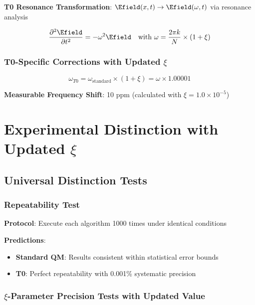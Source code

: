 	\textbf{T0 Resonance Transformation}: $\Efield(x,t) \rightarrow \Efield(\omega,t)$ via resonance analysis
	
	\begin{equation}
		\frac{\partial^2 \Efield}{\partial t^2} = -\omega^2 \Efield \quad \text{with } \omega = \frac{2\pi k}{N} \times (1 + \xi)
	\end{equation}
	
	\subsubsection{T0-Specific Corrections with Updated $\xi$}
	
	\begin{equation}
		\omega_{T0} = \omega_{\text{standard}} \times (1 + \xi) = \omega \times 1.00001
	\end{equation}
	
	\textbf{Measurable Frequency Shift}: 10 ppm (calculated with $\xi = 1.0 \times 10^{-5}$)
	
	\section{Experimental Distinction with Updated $\xi$}
	
	\subsection{Universal Distinction Tests}
	
	\subsubsection{Repeatability Test}
	
	\textbf{Protocol}: Execute each algorithm 1000 times under identical conditions
	
	\textbf{Predictions}:
	\begin{itemize}
		\item \textbf{Standard QM}: Results consistent within statistical error bounds
		\item \textbf{T0}: Perfect repeatability with 0.001\% systematic precision
	\end{itemize}
	
	\subsubsection{$\xi$-Parameter Precision Tests with Updated Value}
	
